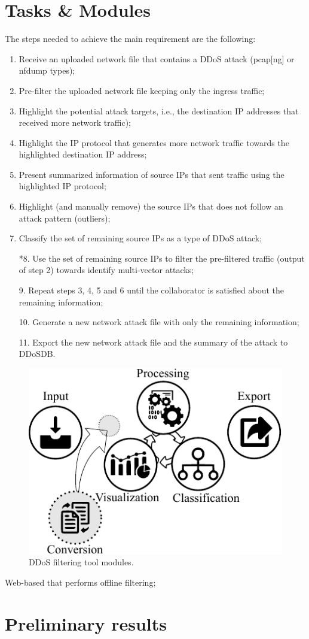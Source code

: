 \documentclass{llncs}
\begin{document}
\section{Tasks \& Modules}

The steps needed to achieve the main requirement are the following:
\begin{enumerate}
	\item Receive an uploaded network file that contains a DDoS attack (pcap[ng] or nfdump types);	
	\item Pre-filter the uploaded network file keeping only the ingress traffic;
	\item Highlight the potential attack targets, i.e., the destination IP addresses that received more network traffic);
	\item Highlight the IP protocol that generates more network traffic towards the highlighted destination IP address;
	\item Present summarized information of source IPs that sent traffic using the highlighted IP protocol;
	\item Highlight (and manually remove) the source IPs that does not follow an attack pattern (outliers);
	\item Classify the set of remaining source IPs as a type of DDoS attack;
	\item[*8.] Use the set of remaining source IPs to filter the pre-filtered traffic (output of step 2) towards identify multi-vector attacks;  
	\item[9.] Repeat steps 3, 4, 5 and 6 until the collaborator is satisfied about the remaining information;
	\item[10.] Generate a new network attack file with only the remaining information;
	\item[11.] Export the new network attack file and the summary of the attack to DDoSDB.
\end{enumerate}

\begin{figure}[!ht] 
\centering 
\includegraphics[]{figs/modules.pdf}
\caption{DDoS filtering tool modules.} 
\label{fig:modules} 
\end{figure}

Web-based that performs offline filtering;

\section{Preliminary results}
\end{document}
